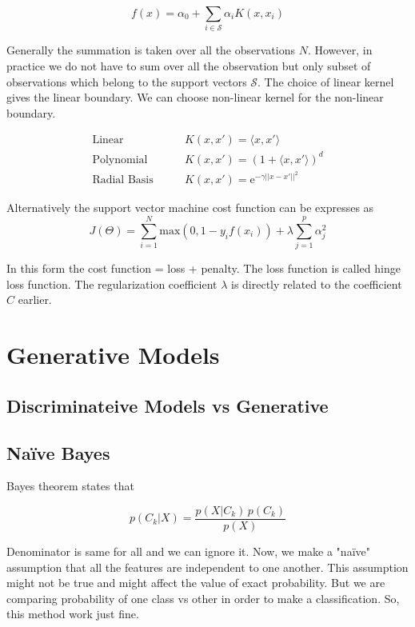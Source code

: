 \documentclass[11pt]{article}
\theoremstyle{definition}
\begin{document}
$$
f(x) = \alpha_0 + \sum_{i\in \mathcal{S}} \alpha_i K(x, x_i)
$$

Generally the summation is taken over all the observations $N$. However, in practice we do not have to sum over all the observation but only subset of observations which belong to the support vectors $\mathcal{S}$. The choice of linear kernel gives the linear boundary. We can choose non-linear kernel for the non-linear boundary. 

$$
\begin{align}
\text{Linear} \qquad & K(x, x') = \langle x, x' \rangle \\
\text{Polynomial} \qquad   & K(x, x') = (1+\langle x, x' \rangle)^d\\
\text{Radial Basis} \qquad	& K(x, x') = \text{e}^{-\gamma||x-x'||^2}
\end{align}
$$


Alternatively the support vector machine cost function can be expresses as 
$$
J(\Theta) = \sum_{i=1}^N \text{max}\left(0, 1 - y_i f(x_i)\right) + \lambda \sum_{j=1}^p \alpha_j^2
$$


In this form the cost function = loss + penalty. The loss function is called hinge loss function. The regularization coefficient $\lambda$ is directly related to the coefficient $C$ earlier. 



\newpage
\section{Generative Models}

\subsection{Discriminateive Models vs Generative}

\subsection{Naïve Bayes }

Bayes theorem states that

$$
p(C_k|X) = \frac{p(X|C_k) \, p(C_k)}{p(X)}
$$


Denominator is same for all and we can ignore it. Now, we make a "naïve" assumption that all the features are independent to one another. This assumption might not be true and might affect the value of exact probability. But we are comparing probability of one class vs other in order to make a classification. So, this method work just fine. 
\end{document}
